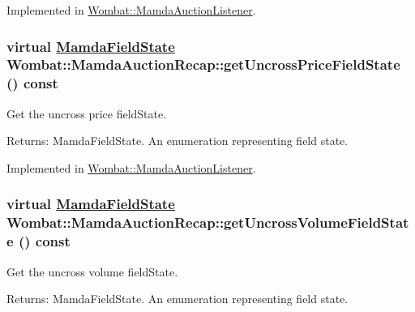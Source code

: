 Implemented in \hyperlink{classWombat_1_1MamdaAuctionListener_65c25c4e3840fd5a70fff6495cccc0c4}{Wombat::Mamda\-Auction\-Listener}.\hypertarget{classWombat_1_1MamdaAuctionRecap_e18a4d3e141bc54c23b8e36c54e5b073}{
\subsubsection[getUncrossPriceFieldState]{\setlength{\rightskip}{0pt plus 5cm}virtual \hyperlink{namespaceWombat_93aac974f2ab713554fd12a1fa3b7d2a}{Mamda\-Field\-State} Wombat::Mamda\-Auction\-Recap::get\-Uncross\-Price\-Field\-State () const}}
\label{classWombat_1_1MamdaAuctionRecap_e18a4d3e141bc54c23b8e36c54e5b073}


Get the uncross price field\-State. 

\begin{Desc}
\item[Returns:]Mamda\-Field\-State. An enumeration representing field state. \end{Desc}


Implemented in \hyperlink{classWombat_1_1MamdaAuctionListener_be7081fdcfdb4f70ad917fe12b6ad2ce}{Wombat::Mamda\-Auction\-Listener}.\hypertarget{classWombat_1_1MamdaAuctionRecap_b266597424a229c509ca514324c11808}{
\subsubsection[getUncrossVolumeFieldState]{\setlength{\rightskip}{0pt plus 5cm}virtual \hyperlink{namespaceWombat_93aac974f2ab713554fd12a1fa3b7d2a}{Mamda\-Field\-State} Wombat::Mamda\-Auction\-Recap::get\-Uncross\-Volume\-Field\-State () const}}
\label{classWombat_1_1MamdaAuctionRecap_b266597424a229c509ca514324c11808}


Get the uncross volume field\-State. 

\begin{Desc}
\item[Returns:]Mamda\-Field\-State. An enumeration representing field state. \end{Desc}



